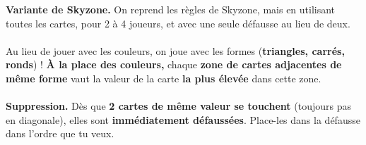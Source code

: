 \documentclass[a4paper]{memoir}
\begin{document}
{\footnotesize

\noindent
\textbf{ Variante de Skyzone.} 
On reprend les règles de Skyzone, mais en utilisant toutes les cartes, pour 2 à 4 joueurs, et avec une seule défausse au lieu de deux.
\\
\\
\noindent
{} Au lieu de jouer avec les couleurs, on joue avec les formes (\textbf{triangles, carrés, ronds}) !  
\textbf{À la place des couleurs,} chaque \textbf{zone de cartes adjacentes de même forme} vaut la valeur de la carte \textbf{la plus élevée} dans cette zone.
\\
\\
\noindent
\textbf{ Suppression.} 
Dès que \textbf{2 cartes de même valeur se touchent} (toujours pas en diagonale), elles sont \textbf{immédiatement défaussées}. 
Place-les dans la défausse dans l'ordre que tu veux.
}
\end{document}
